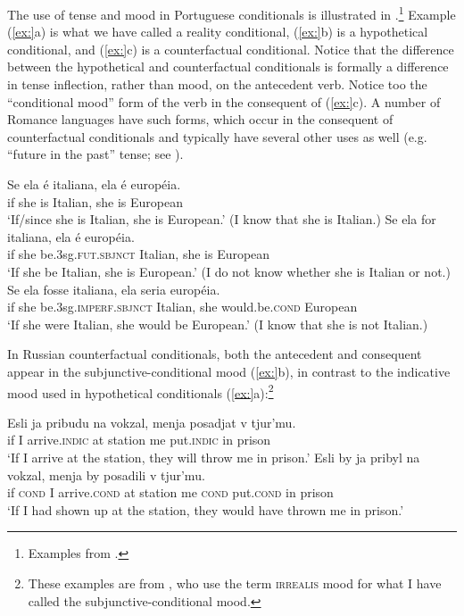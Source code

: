 The use of tense and mood in Portuguese conditionals is illustrated in .\footnote{Examples from \citet{Gomes2008}.} Example (\ref{ex:}a) is what we have called a reality conditional, (\ref{ex:}b) is a hypothetical conditional, and (\ref{ex:}c) is a counterfactual conditional. Notice that the difference between the hypothetical and counterfactual conditionals is formally a difference in tense inflection, rather than mood, on the antecedent verb. Notice too the “conditional mood” form of the verb in the consequent of (\ref{ex:}c). A number of Romance languages have such forms, which occur in the consequent of counterfactual conditionals and typically have several other uses as well (e.g. “future in the past” tense; see ).


\ea
\ea \gll Se  ela  é  italiana,  ela  é  européia.\\
if  she  is  Italian,  she  is  European\\
\glt ‘If/since she is Italian, she is European.’ (I know that she is Italian.)
\ex \gll Se  ela  for  italiana,  ela  é  européia.\\
if  she  be.3sg.\textsc{fut.sbjnct}  Italian,  she  is  European\\
\glt ‘If she be Italian, she is European.’ (I do not know whether she is Italian or not.)
\ex \gll  Se  ela  fosse  italiana,  ela  seria  européia.\\
if  she  be.3sg.\textsc{imperf.sbjnct}  Italian,  she  would.be.\textsc{cond}  European\\
\glt ‘If she were Italian, she would be European.’ (I know that she is not Italian.)
\z \z


In Russian counterfactual conditionals, both the antecedent and consequent appear in the subjunctive-conditional mood (\ref{ex:}b), in contrast to the indicative mood used in hypothetical conditionals (\ref{ex:}a):\footnote{These examples are from \citet[251]{ChungTimberlake1985}, who use the term \textsc{irrealis} mood for what I have called the subjunctive-conditional mood.}


\ea
\ea \gll Esli  ja  pribudu  na  vokzal,  menja  posadjat  v  tjur’mu.\\
if  I  arrive.\textsc{indic}  at  station  me  put.\textsc{indic}  in  prison\\
\glt ‘If I arrive at the station, they will throw me in prison.’ 
\ex \gll Esli  by  ja  pribyl  na  vokzal,  menja  by  posadili  v  tjur’mu.\\
if  \textsc{cond}  I  arrive.\textsc{cond}  at  station  me  \textsc{cond}  put.\textsc{cond}  in  prison\\
\glt ‘If I had shown up at the station, they would have thrown me in prison.’
\z \z


